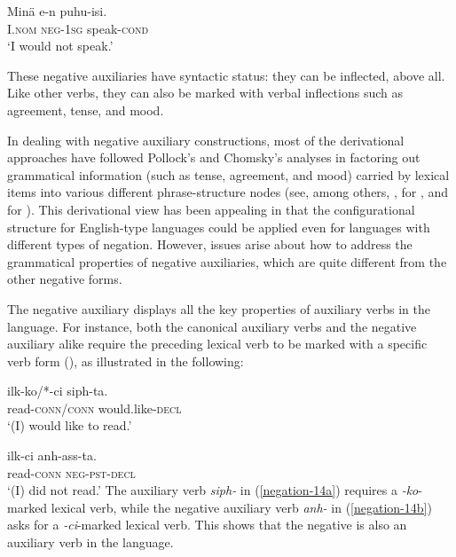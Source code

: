 \documentclass[output=paper
	        ,collection
	        ,collectionchapter
 	        ,biblatex
                ,babelshorthands
                ,newtxmath
                ,draftmode
                ,colorlinks, citecolor=brown
]{langscibook}
\begin{document}
\begin{exe}
\begin{xlist}
\begin{exe}
\begin{xlist}
\ea
\gll Min\"{a} e-n puhu-isi. \\
     I.\textsc{nom} \textsc{neg}-\textsc{1sg} speak-\textsc{cond} \\
\glt `I would not speak.'
\z

\noindent
These negative auxiliaries have syntactic status: they can be
inflected, above all. Like other verbs, they can also be marked
with verbal inflections such as agreement, tense, and mood.

In dealing with negative auxiliary constructions,
most of the derivational approaches have
followed Pollock's and Chomsky's analyses in factoring out grammatical
information (such as tense, agreement, and mood) carried by lexical items into various different phrase-structure nodes (see, among others, \citealt{Hagstrom:02}, \citealt{Han:07} for , and \citealt{Vasishth:00} for ).
This derivational view has
been appealing in that the configurational structure for English-type
languages could be applied even for languages with different types
of negation. However, issues arise about how to address the grammatical
properties of negative auxiliaries, which are quite different from the
other negative forms.
%
%
%
%

%


%
The  negative auxiliary displays all the key properties of auxiliary verbs in the language. For instance, both the canonical auxiliary verbs and
the negative auxiliary alike require the preceding lexical verb to be marked with a specific verb form (\vform), as illustrated
in the following:

\eal
\ex\label{negation-14a}
\gll ilk-ko/*-ci siph-ta. \\
     read-\textsc{conn}/\textsc{conn} would.like-\textsc{decl} \\
\glt `(I) would like to read.'

\ex\label{negation-14b}
\gll ilk-ci anh-ass-ta. \\
     read-\textsc{conn} \textsc{neg}-\textsc{pst}-\textsc{decl} \\
\glt `(I) did not read.'
\zl
\noindent
The auxiliary verb \textit{siph-} in (\ref{negation-14a}) requires a
\textit{-ko}-marked lexical verb, while the negative auxiliary
 verb \textit{anh-} in (\ref{negation-14b}) asks for a \textit{-ci}-marked lexical
 verb. This shows that the negative is also an auxiliary verb in the language.


\end{xlist}
\end{exe}
\end{xlist}
\end{exe}
\end{document}
